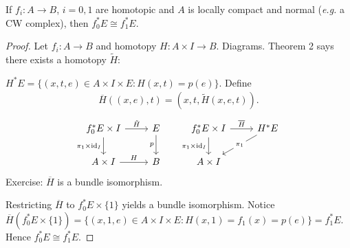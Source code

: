 \documentclass[12pt,class=article,crop=false]{standalone}
\begin{document}
\begin{thm}
If $ f_i: A \to B$, $ i=0,1$ are homotopic and  $ A$ is locally compact and normal (\emph{e.g.} a CW complex), then  $ f_0^* E \cong f_1^* E$.
\end{thm}
\begin{proof}
Let $ f_i: A \to B$ and homotopy $H: A \times I \to B$. Diagrams. Theorem 2 says there exists a homotopy $ \widetilde{ H}:$

$ H^* E = \{(x,t,e) \in A \times I \times E: H(x,t) = p(e)\} $. Define 
 \begin{align*}
	\overline{H} ((x,e),t) = (x,t, \widetilde{ H}(x,e,t)).
\end{align*}
\[\begin{tikzcd}
	{f_0^*E \times I} & E & {f_0^*E \times I } & {H^*E} \\
	{A \times I} & B & {A \times I}
	\arrow["{\pi_1 \times \text{id}_I}"', from=1-1, to=2-1]
	\arrow["{\tilde{H}}", from=1-1, to=1-2]
	\arrow["H", from=2-1, to=2-2]
	\arrow["p"', from=1-2, to=2-2]
	\arrow["{\pi_1 \times \text{id}_I}"', from=1-3, to=2-3]
	\arrow["{\overline{H}}", from=1-3, to=1-4]
	\arrow["{\pi_1}"{description}, from=1-4, to=2-3]
\end{tikzcd}\]
Exercise: $ \overline{H}$ is a bundle isomorphism.


Restricting $ \overline{H}$ to $ f_0^* E \times \{1\}$ yields a bundle isomorphism. Notice $ \overline{H}(f_0^* E \times \{1\} ) = \{(x,1,e) \in A \times I \times E: H(x,1) = f_1(x) = p(e)\} =f_1^* E$. Hence $ f_0^* E \cong f_1^* E$.
\end{proof}
\end{document}

